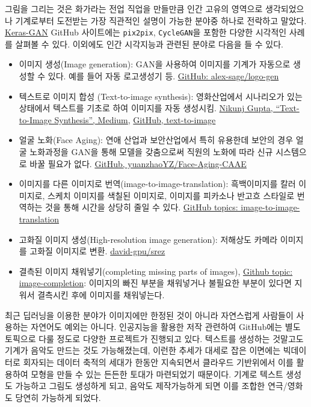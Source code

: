 \documentclass[smallextended]{svjour3}       %
\providecommand{\tightlist}{%
  \setlength{\itemsep}{0pt}\setlength{\parskip}{0pt}}
\begin{document}
그림을 그리는 것은 화가라는 전업 직업을 만들만큼 인간 고유의 영역으로
생각되었으나 기계로부터 도전받는 가장 직관적인 설명이 가능한 분야중
하나로 전락하고 말았다.
\href{https://github.com/eriklindernoren/Keras-GAN}{Keras-GAN} GitHub
사이트에는 \texttt{pix2pix}, \texttt{CycleGAN}을 포함한 다양한 시각적인
사례를 살펴볼 수 있다. 이외에도 인간 시각지능과 관련된 분야로 다음을 들
수 있다.

\begin{itemize}
\tightlist
\item
  이미지 생성(Image generation): GAN을 사용하여 이미지를 기계가 자동으로
  생성할 수 있다. 예를 들어 자동 로고생성기 등.
  \href{https://github.com/alex-sage/logo-gen}{GitHub:
  alex-sage/logo-gen}
\item
  텍스트로 이미지 합성 (Text-to-image synthesis): 영화산업에서
  시나리오가 있는 상태에서 텍스트를 기초로 하여 이미지를 자동 생성시킴.
  \href{https://medium.com/datadriveninvestor/text-to-image-synthesis-6e5de1bf86ec}{Nikunj
  Gupta, ``Text-to-Image Synthesis'', Medium},
  \href{https://github.com/crisbodnar/text-to-image}{GitHub,
  text-to-image}
\item
  얼굴 노화(Face Aging): 연애 산업과 보안산업에서 특히 유용한데 보안의
  경우 얼굴 노화과정을 GAN을 통해 모델을 갖춤으로써 직원의 노화에 따라
  신규 시스템으로 바꿀 필요가 없다.
  \href{https://github.com/yuanzhaoYZ/Face-Aging-CAAE}{GitHub,
  yuanzhaoYZ/Face-Aging-CAAE}
\item
  이미지를 다른 이미지로 번역(image-to-image-translation): 흑백이미지를
  칼러 이미지로, 스케치 이미지를 색칠된 이미지로, 이미지를 피카소나
  반고흐 스타일로 번역하는 것을 통해 시간을 상당히 줄일 수 있다.
  \href{https://github.com/topics/image-to-image-translation}{GitHub
  topics: image-to-image-translation}
\item
  고화질 이미지 생성(High-resolution image generation): 저해상도 카메라
  이미지를 고화질 이미지로 변환.
  \href{https://github.com/david-gpu/srez}{david-gpu/srez}
\item
  결측된 이미지 채워넣기(completing missing parts of images),
  \href{https://github.com/topics/image-completion}{Github topic:
  image-completion}: 이미지의 빠진 부분을 채워넣거나 불필요한 부분이
  있다면 지워서 결측시킨 후에 이미지를 채워넣는다.
\end{itemize}

최근 딥러닝을 이용한 분야가 이미지에만 한정된 것이 아니라 자연스럽게
사람들이 사용하는 자연어도 예외는 아니다. 인공지능을 활용한 저작
관련하여 GitHub에는 별도 토픽으로 다룰 정도로 다양한 프로젝트가 진행되고
있다. 텍스트를 생성하는 것말고도 기계가 음악도 만드는 것도 가능해졌는데,
이런한 추세가 대세로 잡은 이면에는 빅데이터로 회자되는 데이터 축적의
세대가 한동안 지속되면서 클라우드 기반위에서 이를 활용하여 모형을 만들
수 있는 든든한 토대가 마련되었기 때문이다. 기계로 텍스트 생성도 가능하고
그림도 생성하게 되고, 음악도 제작가능하게 되면 이를 조합한 연극/영화도
당연히 가능하게 되었다.
\end{document}
